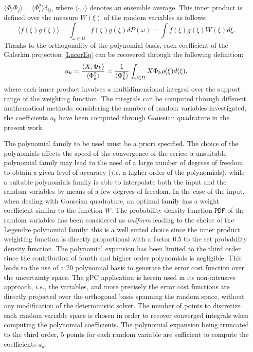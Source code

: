 \documentclass[conf]{new-aiaa}
\begin{document}
%
$\langle\Phi_i \Phi_j\rangle=\langle\Phi_i^2\rangle \delta_{ij}$,
%
where $\langle\cdot,\cdot\rangle$ denotes an ensemble average.
%
This inner product is defined over the measure $W(\xi)$ of the random variables as follows:
%
\begin{equation}
\langle f(\xi)g(\xi)\rangle= \int_{\omega \in \Omega} f(\xi)g(\xi)dP(\omega)= \int f(\xi)g(\xi) W(\xi) d \xi.
\end{equation}
%
Thanks to the orthogonality of the polynomial basis, each coefficient of the Galerkin projection \eqref{LucorEq} can be recovered through the following definition:
%
\begin{equation}
a_k = \frac{\langle X,\Phi_k\rangle }{\langle \Phi_{k}^2\rangle}= \frac{1}{\langle \Phi_{k}^2\rangle}\int_{\omega \in \Omega} X \Phi_k \rho({\bf \xi}) d({\bf \xi}),
\end{equation}
%
where each inner product involves a multidimensional integral over the support range of the weighting function.
%
The integrals can be computed through different mathematical methods: considering the number of random variables investigated, the coefficients $a_k$ have been computed through Gaussian quadrature in the present work.

The polynomial family to be used must be a priori specified. The choice of the polynomials affects the speed of the convergence of the series: a unsuitable polynomial family may lead to the need of a large number of degrees of freedom to obtain a given level of accuracy (\textit{i.e.} a higher order of the polynomials), while a suitable polynomials family is able to interpolate both the input and the random variables by means of a few degrees of freedom.
%
In the case of the input, when dealing with Gaussian quadrature, an optimal family has a weight coefficient similar to the function $W$.
%
The probability density function $\texttt{PDF}$ of the random variables has been considered as \textit{uniform} leading to the choice of the Legendre polynomial family: this is a well suited choice since the inner product weighting function is directly proportional with a factor $0.5$ to the set probability density function.
%
The polynomial expansion has been limited to the third order since the contribution of fourth and higher order polynomials is negligible.
%
This leads to the use of a 20 polynomial basis to generate the error cost function over the uncertainty space. 
%
The gPC application is herein used in its non-intrusive approach, \textit{i.e.}, the variables, and more precisely the error cost functions are directly projected over the orthogonal basis spanning the random space, without any modification of the deterministic solver. 
%
The number of points to discretize each random variable space is chosen in order to recover converged integrals when computing the polynomial coefficients.
%
The polynomial expansion being truncated to the third order, $5$ points for each random variable are sufficient to compute the coefficients $a_k$.
%
\end{document}
